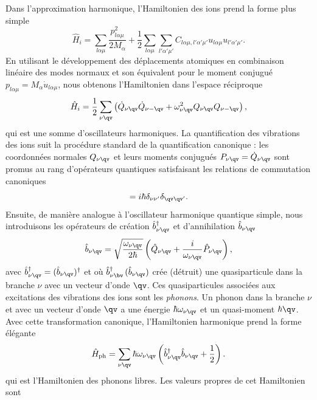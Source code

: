 Dans l'approximation harmonique, l'Hamiltonien des ions prend la forme plus simple
\begin{equation}
    \hat{H}_i = \sum_{l\alpha\mu}\frac{p_{l\alpha\mu}^2}{2M_\alpha}+\frac{1}{2}\sum_{l\alpha\mu}\sum_{l'\alpha'\mu'}C_{l\alpha\mu,l'\alpha'\mu'}u_{l\alpha\mu}u_{l'\alpha'\mu'}.
\end{equation}
En utilisant le développement des déplacements atomiques en combinaison linéaire des modes normaux et son équivalent pour le moment conjugué $p_{l\alpha\mu}=M_\alpha\dot{u}_{l\alpha\mu}$, nous obtenons l'Hamiltonien dans l'espace réciproque
\begin{equation}
    \hat{H}_i = \frac{1}{2}\sum_{\nu\qv}\left(\dot{Q}_{\nu\qv}\dot{Q}_{\nu-\qv}+\omega_{\nu\qv}^2Q_{\nu\qv}Q_{\nu-\qv}\right),
\end{equation}
qui est une somme d'oscillateurs harmoniques. La quantification des vibrations des ions suit la procédure standard de la quantification canonique : les coordonnées normales $Q_{\nu\qv}$ et leurs moments conjugués $P_{\nu\qv}=\dot{Q}_{\nu\qv}$ sont promus au rang d'opérateurs quantiques satisfaisant les relations de commutation canoniques
\begin{equation}
    [\hat{Q}_{\nu\qv},\hat{P}_{\nu'\qv'}]=i\hbar\delta_{\nu\nu'}\delta_{\qv\qv'}.
\end{equation}
Ensuite, de manière analogue à l'oscillateur harmonique quantique simple, nous introduisons les opérateurs de création $\hat{b}^\dag_{\nu\qv}$ et d'annihilation $\hat{b}_{\nu\qv}$
\begin{equation}
    \hat{b}_{\nu\qv}=\sqrt{\frac{\omega_{\nu\qv}}{2\hbar}}\left(\hat{Q}_{\nu\qv}+\frac{i}{\omega_{\nu\qv}}\hat{P}_{\nu\qv}\right),
\end{equation}
avec $\hat{b}^\dag_{\nu\qv}=(\hat{b}_{\nu\qv})^\dag$ et où $\hat{b}^\dag_{\nu\bv}\,(\hat{b}_{\nu\qv})$ crée (détruit) une quasiparticule dans la branche $\nu$ avec un vecteur d'onde $\qv$. Ces quasiparticules associées aux excitations des vibrations des ions sont les \textit{phonons}. Un phonon dans la branche $\nu$ et avec un vecteur d'onde $\qv$ a une énergie $\hbar\omega_{\nu\qv}$ et un quasi-moment $\hbar\qv$. Avec cette transformation canonique, l'Hamiltonien harmonique prend la forme élégante
\begin{equation}
    \hat{H}_\text{ph}=\sum_{\nu\qv}\hbar\omega_{\nu\qv}\left(\hat{b}_{\nu\qv}^\dag \hat{b}_{\nu\qv}+\frac{1}{2}\right).
\end{equation}
qui est l'Hamiltonien des phonons libres. Les valeurs propres de cet Hamiltonien sont
